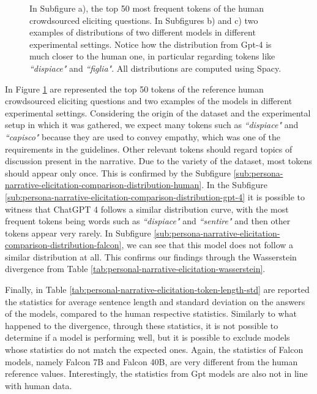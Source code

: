 \begin{figure}[!htbp]
    \caption{In Subfigure a), the top 50 most frequent tokens of the human crowdsourced eliciting questions. In Subfigures b) and c) two examples of distributions of two different models in different experimental settings. Notice how the distribution from Gpt-4 is much closer to the human one, in particular regarding tokens like \emph{``dispiace"} and \emph{``figlia"}. All distributions are computed using Spacy.}
    \label{fig:persona-narrative-elicitation-comparison-distribution}
\end{figure}

In Figure \ref{fig:persona-narrative-elicitation-comparison-distribution} are represented the top 50 tokens of the reference human crowdsourced eliciting questions and two examples of the models in different experimental settings. Considering the origin of the dataset and the experimental setup in which it was gathered, we expect many tokens such as \emph{``dispiace"} and \emph{``capisco"} because they are used to convey empathy, which was one of the requirements in the guidelines. Other relevant tokens should regard topics of discussion present in the narrative. Due to the variety of the dataset, most tokens should appear only once. This is confirmed by the Subfigure \ref{sub:persona-narrative-elicitation-comparison-distribution-human}. 
In the Subfigure \ref{sub:persona-narrative-elicitation-comparison-distribution-gpt-4} it is possible to witness that ChatGPT 4 follows a similar distribution curve, with the most frequent tokens being words such as \emph{``dispiace"} and \emph{``sentire"} and then other tokens appear very rarely. 
In Subfigure \ref{sub:persona-narrative-elicitation-comparison-distribution-falcon}, we can see that this model does not follow a similar distribution at all. This confirms our findings through the Wasserstein divergence from Table \ref{tab:personal-narrative-elicitation-wasserstein}.

% 
Finally, in Table \ref{tab:personal-narrative-elicitation-token-length-std} are reported the statistics for average sentence length and standard deviation on the answers of the models, compared to the human respective statistics. Similarly to what happened to the divergence, through these statistics, it is not possible to determine if a model is performing well, but it is possible to exclude models whose statistics do not match the expected ones. Again, the statistics of Falcon models, namely Falcon 7B and Falcon 40B, are very different from the human reference values. Interestingly, the statistics from Gpt models are also not in line with human data. 

